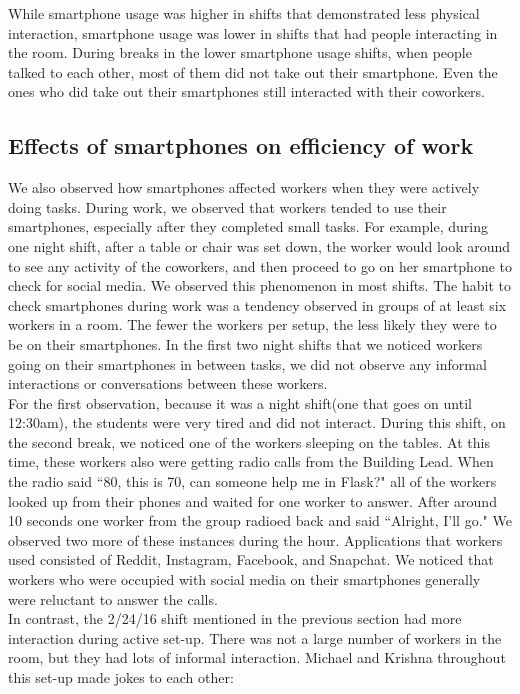 \documentclass[letterpaper, 12pt]{report}
\begin{document}
	While smartphone usage was higher in shifts that demonstrated less physical interaction, smartphone usage was lower in shifts that had people interacting in the room. During breaks in the lower smartphone usage shifts, when people talked to each other, most of them did not take out their smartphone. Even the ones who did take out their smartphones still interacted with their coworkers.
	
	\subsection{Effects of smartphones on efficiency of work}
	We also observed how smartphones affected workers when they were actively doing tasks. During work, we observed that workers tended to use their smartphones, especially after they completed small tasks. For example, during one night shift, after a table or chair was set down, the worker would look around to see any activity of the coworkers, and then proceed to go on her smartphone to check for social media. We observed this phenomenon in most shifts. The habit to check smartphones during work was a tendency observed in groups of at least six workers in a room. The fewer the workers per setup, the less likely they were to be on their smartphones. In the first two night shifts that we noticed workers going on their smartphones in between tasks, we did not observe any informal interactions or conversations between these workers.\\
	
	For the first observation, because it was a night shift(one that goes on until 12:30am), the students were very tired and did not interact. During this shift, on the second break, we noticed one of the workers sleeping on the tables. At this time, these workers also were getting radio calls from the Building Lead. When the radio said ``80, this is 70, can someone help me in Flask?" all of the workers looked up from their phones and waited for one worker to answer. After around 10 seconds one worker from the group radioed back and said ``Alright, I'll go." We observed two more of these instances during the hour. Applications that workers used consisted of Reddit, Instagram, Facebook, and Snapchat. We noticed that workers who were occupied with social media on their smartphones generally were reluctant to answer the calls.\\
		
	In contrast, the 2/24/16 shift mentioned in the previous section had more interaction during active set-up. There was not a large number of workers in the room, but they had lots of informal interaction. Michael and Krishna throughout this set-up made jokes to each other:
		
\end{document}
